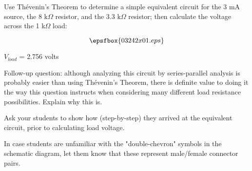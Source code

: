 

Use Th\'evenin's Theorem to determine a simple equivalent circuit for the 3 mA source, the 8 k$\Omega$ resistor, and the 3.3 k$\Omega$ resistor; then calculate the voltage across the 1 k$\Omega$ load:

$$\epsfbox{03242x01.eps}$$







$V_{load}$ = 2.756 volts

\vskip 10pt

Follow-up question: although analyzing this circuit by series-parallel analysis is probably easier than using Th\'evenin's Theorem, there is definite value to doing it the way this question instructs when considering many different load resistance possibilities.  Explain why this is.







Ask your students to show how (step-by-step) they arrived at the equivalent circuit, prior to calculating load voltage.

In case students are unfamiliar with the "double-chevron" symbols in the schematic diagram, let them know that these represent male/female connector pairs.




